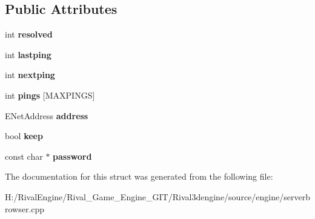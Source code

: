 \subsection*{Public Attributes}
\begin{DoxyCompactItemize}
\item 
\mbox{\label{structserverinfo_a1b0d10d966038762de74e72f14df9cf6}} 
int {\bfseries resolved}
\item 
\mbox{\label{structserverinfo_a2fef9db659e1c092b3bcc687baf8bea8}} 
int {\bfseries lastping}
\item 
\mbox{\label{structserverinfo_a58cf7b3ae493f880d723f24941529eec}} 
int {\bfseries nextping}
\item 
\mbox{\label{structserverinfo_a139959283b09102afa0bf0a1c752de97}} 
int {\bfseries pings} \mbox{[}M\+A\+X\+P\+I\+N\+GS\mbox{]}
\item 
\mbox{\label{structserverinfo_afe2bf4ff531756acdcbe25c8f14adc92}} 
E\+Net\+Address {\bfseries address}
\item 
\mbox{\label{structserverinfo_a539d5648cf3e20fdb70e054cc63bddf7}} 
bool {\bfseries keep}
\item 
\mbox{\label{structserverinfo_a97688d9e74e850154390ae1a466bd945}} 
const char $\ast$ {\bfseries password}
\end{DoxyCompactItemize}


The documentation for this struct was generated from the following file\+:\begin{DoxyCompactItemize}
\item 
H\+:/\+Rival\+Engine/\+Rival\+\_\+\+Game\+\_\+\+Engine\+\_\+\+G\+I\+T/\+Rival3dengine/source/engine/serverbrowser.\+cpp\end{DoxyCompactItemize}
